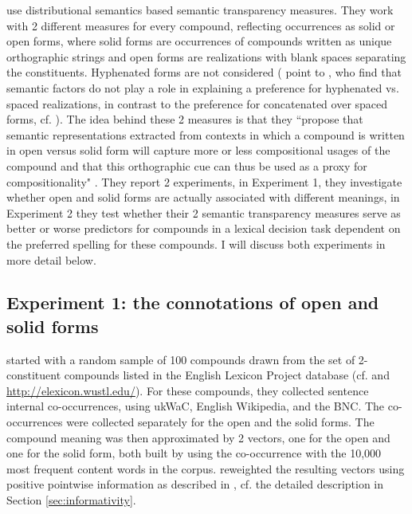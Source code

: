 \citet{Marellietal:2014} use distributional semantics based semantic
transparency measures. They work with 2 different
measures for every compound, reflecting occurrences as solid or open
forms, where solid forms are occurrences of compounds written as unique
orthographic strings and open forms are realizations with blank
spaces separating the constituents. Hyphenated forms are not
considered (\citealt[Footnote 1]{Marellietal:2014} point to
\citealt{KupermanandBertram:2013}, who find that semantic factors do not
play a role in explaining a preference for hyphenated vs. spaced
realizations, in contrast to the preference for 
concatenated over spaced forms,
cf. \citealt[960--962]{KupermanandBertram:2013}). The idea behind these 2 measures
is that they ``propose that semantic representations extracted from
contexts in which a compound is written in open versus solid form will
capture more or less compositional usages of the compound and that
this orthographic cue can thus be used as  a proxy for
compositionality" \citep[1424]{Marellietal:2014}. They report 2
experiments, in Experiment 1, they investigate whether open and solid
forms are actually associated with different meanings, in Experiment 2
they test whether their 2 semantic transparency measures serve as
better or worse predictors for compounds in a lexical decision task
dependent on the preferred spelling for these compounds. I will
discuss both experiments in more detail below.

\subsection[Experiment 1: connotations]{Experiment 1: the connotations of open and solid forms}

\citet{Marellietal:2014} started with a random sample of 100 compounds
drawn from the set of 2-constituent compounds listed in the English
Lexicon Project database (cf. \citealt{Balotaetal:2007} and \url{http://elexicon.wustl.edu/}). For these compounds, they collected sentence internal
co-occurrences, using ukWaC, English Wikipedia, and the BNC. The co-occurrences were collected separately for the open and
the solid forms. The compound meaning was then approximated by 2
vectors, one for the open and one for the solid form,  both built by
using the co-occurrence with the 10,000 most frequent content words in
the corpus. \citet{Marellietal:2014} reweighted the resulting vectors
using positive pointwise information as described in
\citet{TurneyandPantel:2010}, cf. the detailed description in Section \ref{sec:informativity}.

